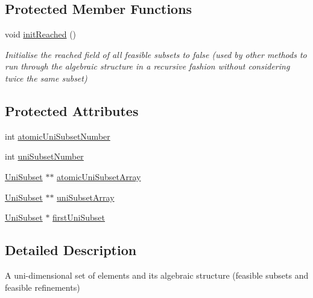 \subsection*{Protected Member Functions}
\begin{DoxyCompactItemize}
\item 
\hypertarget{classUniSet_a140f02dfb3f186cbc49fe28d238aa2e1}{void \hyperlink{classUniSet_a140f02dfb3f186cbc49fe28d238aa2e1}{init\-Reached} ()}\label{classUniSet_a140f02dfb3f186cbc49fe28d238aa2e1}

\begin{DoxyCompactList}\small\item\em Initialise the {\ttfamily reached} field of all feasible subsets to {\ttfamily false} (used by other methods to run through the algebraic structure in a recursive fashion without considering twice the same subset) \end{DoxyCompactList}\end{DoxyCompactItemize}
\subsection*{Protected Attributes}
\begin{DoxyCompactItemize}
\item 
int \hyperlink{classUniSet_addac67921c058dc9ffa2074b3d59151f}{atomic\-Uni\-Subset\-Number}
\item 
int \hyperlink{classUniSet_a159ec0413efd05616c2f2445b7d8b2b5}{uni\-Subset\-Number}
\item 
\hyperlink{classUniSubset}{Uni\-Subset} $\ast$$\ast$ \hyperlink{classUniSet_a16746d02b5503c5d8c62fe4dff46c5b3}{atomic\-Uni\-Subset\-Array}
\item 
\hyperlink{classUniSubset}{Uni\-Subset} $\ast$$\ast$ \hyperlink{classUniSet_a154ae422d9f248c8b50f39d575f9b3c0}{uni\-Subset\-Array}
\item 
\hyperlink{classUniSubset}{Uni\-Subset} $\ast$ \hyperlink{classUniSet_a8b2ca464176feddcd8d96c75514eba6b}{first\-Uni\-Subset}
\end{DoxyCompactItemize}


\subsection{Detailed Description}
A uni-\/dimensional set of elements and its algebraic structure (feasible subsets and feasible refinements) 

